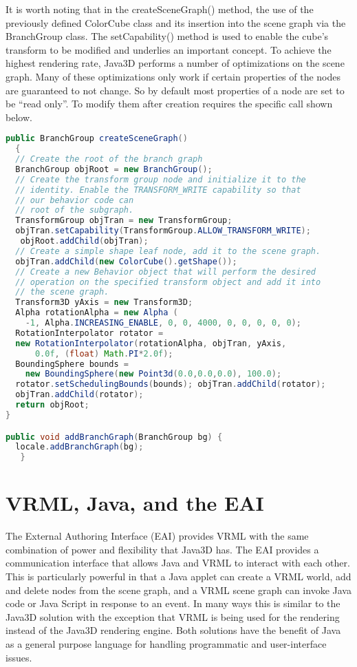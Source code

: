 It is worth noting that in the createSceneGraph() method, the use of the previously defined ColorCube class and its insertion into the scene graph via the BranchGroup class. The setCapability() method is used to enable the cube’s transform to be modified and underlies an important concept. To achieve the highest rendering rate, Java3D performs a number of optimizations on the scene graph. Many of these optimizations only work if certain properties of the nodes are guaranteed to not change. So by default most properties of a node are set to be ``read only''. To modify them after creation requires the specific call shown below.

\begin{lstlisting}[language=Java, caption={}, numbers=none, frame=none]
public BranchGroup createSceneGraph()
  {
  // Create the root of the branch graph
  BranchGroup objRoot = new BranchGroup();
  // Create the transform group node and initialize it to the
  // identity. Enable the TRANSFORM_WRITE capability so that
  // our behavior code can
  // root of the subgraph.
  TransformGroup objTran = new TransformGroup;
  objTran.setCapability(TransformGroup.ALLOW_TRANSFORM_WRITE);
   objRoot.addChild(objTran);
  // Create a simple shape leaf node, add it to the scene graph.
  objTran.addChild(new ColorCube().getShape());
  // Create a new Behavior object that will perform the desired
  // operation on the specified transform object and add it into
  // the scene graph.
  Transform3D yAxis = new Transform3D;
  Alpha rotationAlpha = new Alpha (
    -1, Alpha.INCREASING_ENABLE, 0, 0, 4000, 0, 0, 0, 0, 0);
  RotationInterpolator rotator =
  new RotationInterpolator(rotationAlpha, objTran, yAxis,
      0.0f, (float) Math.PI*2.0f);
  BoundingSphere bounds =
    new BoundingSphere(new Point3d(0.0,0.0,0.0), 100.0);
  rotator.setSchedulingBounds(bounds); objTran.addChild(rotator);
  objTran.addChild(rotator);
  return objRoot;
}

public void addBranchGraph(BranchGroup bg) {
  locale.addBranchGraph(bg);
   }
\end{lstlisting}

\section{VRML, Java, and the EAI}

The External Authoring Interface (EAI) provides VRML with the same combination of power and flexibility that Java3D has. The EAI provides a communication interface that allows Java and VRML to interact with each other. This is particularly powerful in that a Java applet can create a VRML world, add and delete nodes from the scene graph, and a VRML scene graph can invoke Java code or Java Script in response to an event. In many ways this is similar to the Java3D solution with the exception that VRML is being used for the rendering instead of the Java3D rendering engine. Both solutions have the benefit of Java as a general purpose language for handling programmatic and user-interface issues.

